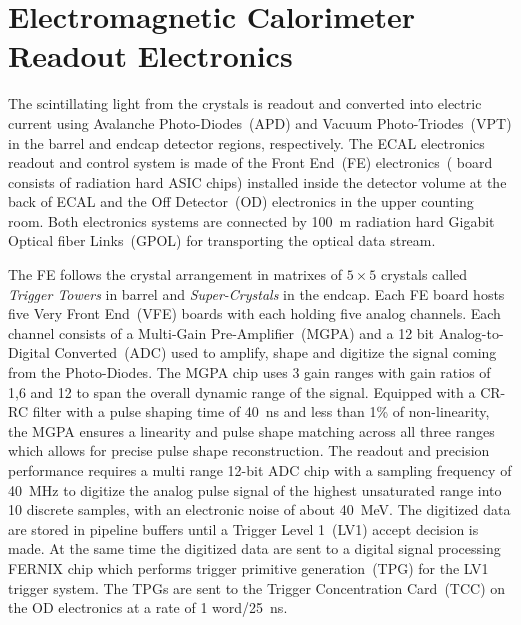 \section{Electromagnetic Calorimeter Readout Electronics}
The scintillating light from the \pb crystals is readout and converted into electric current using Avalanche Photo-Diodes~(APD) and Vacuum Photo-Triodes~(VPT) in the barrel and endcap detector regions, respectively. %
\newline
The ECAL electronics readout and control system is made of the Front End~(FE) electronics~( board consists of radiation hard ASIC chips) installed inside the detector volume at the back of ECAL and the Off Detector~(OD) electronics in the upper counting room. Both electronics systems are connected by 100~m radiation hard Gigabit Optical fiber Links~(GPOL) for transporting the optical data stream. 
\par
The FE follows the crystal arrangement in matrixes of $5\times5$ crystals called \textit{Trigger Towers} in barrel and \textit{Super-Crystals} in the endcap. Each FE board hosts five Very Front End~(VFE) boards with each holding five analog channels. Each channel consists of a Multi-Gain Pre-Amplifier~(MGPA) and a 12 bit Analog-to-Digital Converted~(ADC) used to amplify, shape and digitize the signal coming from the Photo-Diodes.
\newline
The MGPA chip uses 3 gain ranges with gain ratios of 1,6 and 12 to span the overall dynamic range of the signal. Equipped with a CR-RC filter  with a pulse shaping time of 40~ns and less than 1\% of non-linearity, the MGPA ensures a linearity and pulse shape matching across all three ranges which allows for precise pulse shape reconstruction.
\newline
The readout and precision performance requires a multi range 12-bit ADC chip with a sampling frequency of 40~MHz to digitize the analog pulse signal of the highest unsaturated range into 10 discrete samples, with an electronic noise  of about 40~MeV.
\newline
The digitized data  are stored in pipeline buffers until a Trigger Level 1~(LV1) accept decision is made. At the same time the digitized data are sent to a digital signal processing FERNIX chip which performs trigger primitive generation~(TPG) for the LV1 trigger system. The TPGs are sent to the Trigger Concentration Card~(TCC) on the OD electronics at a rate of 1 word/25~ns.
